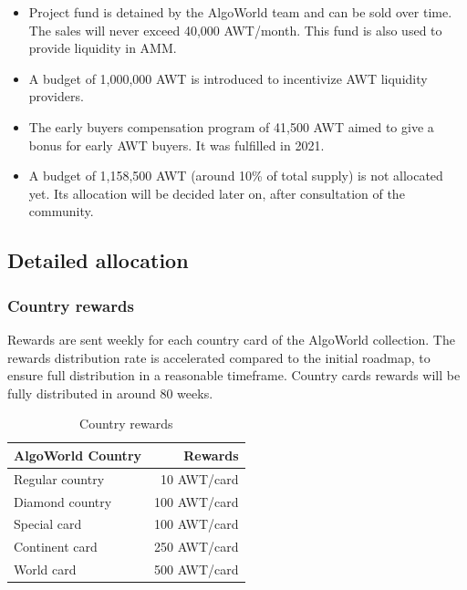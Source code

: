 \documentclass{article}
\begin{document}
\begin{itemize}
\item Project fund is detained by the AlgoWorld team and can be sold over time. The sales will never exceed 40,000 AWT/month. This fund is also used to provide liquidity in AMM.
\item A budget of 1,000,000 AWT is introduced to incentivize AWT liquidity providers. 
\item The early buyers compensation program of 41,500 AWT aimed to give a bonus for early AWT buyers. It was fulfilled in 2021. 
\item A budget of 1,158,500 AWT (around 10\% of total supply) is not allocated yet. Its allocation will be decided later on, after consultation of the community.
\end{itemize}

\newpage
\subsection{Detailed allocation}
\subsubsection{Country rewards}
Rewards are sent weekly for each country card of the AlgoWorld collection.
The rewards distribution rate is accelerated compared to the initial roadmap, to ensure full distribution in a reasonable timeframe. Country cards rewards will be fully distributed in around 80 weeks.
\begin{table}[ht]
\centering
\begin{tabular}{l|r}
AlgoWorld Country & Rewards \\\hline
Regular country & 10 AWT/card \\
Diamond country & 100 AWT/card \\
Special card & 100 AWT/card \\
Continent card & 250 AWT/card \\
World card & 500 AWT/card \\
\end{tabular}
\caption{\label{tab:widgets}Country rewards}
\end{table}
\end{document}
